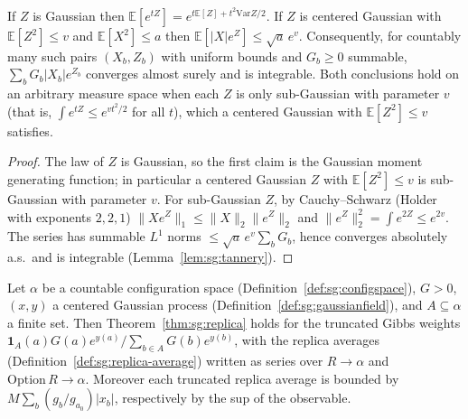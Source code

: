 \begin{lemma}\label{lem:sg:gaussexp}
  \leanok
If $Z$ is Gaussian then $\mathbb E[e^{tZ}]=e^{t\mathbb E[Z]+t^2\mathrm{Var}Z/2}$. If $Z$ is centered Gaussian with $\mathbb E[Z^2]\le v$ and
$\mathbb E[X^2]\le a$ then $\mathbb E[|X|e^{Z}]\le\sqrt a\,e^v$. Consequently, for countably many such pairs $(X_b,Z_b)$ with uniform bounds and
$G_b\ge0$ summable, $\sum_bG_b|X_b|e^{Z_b}$ converges almost surely and is integrable.
Both conclusions hold on an arbitrary measure space when each $Z$ is only sub-Gaussian with parameter $v$
(that is, $\int e^{tZ}\le e^{vt^2/2}$ for all $t$), which a centered Gaussian with $\mathbb E[Z^2]\le v$ satisfies.
\end{lemma}

\begin{proof}
  \leanok
The law of $Z$ is Gaussian, so the first claim is the Gaussian moment generating function; in particular a centered
Gaussian $Z$ with $\mathbb E[Z^2]\le v$ is sub-Gaussian with parameter $v$. For sub-Gaussian $Z$, by Cauchy--Schwarz (Holder with exponents
$2,2,1$) $\|Xe^Z\|_1\le\|X\|_2\|e^Z\|_2$ and $\|e^Z\|_2^2=\int e^{2Z}\le e^{2v}$. The series has summable $L^1$ norms
$\le\sqrt a\,e^v\sum_bG_b$, hence converges absolutely a.s.\ and is integrable (Lemma~\ref{lem:sg:tannery}).
\end{proof}

\begin{theorem}\label{thm:sg:truncation}
  \leanok
Let $\alpha$ be a countable configuration space (Definition~\ref{def:sg:configspace}), $G>0$, $(x,y)$ a centered Gaussian process (Definition~\ref{def:sg:gaussianfield}), and $A\subseteq\alpha$ a finite set. Then Theorem~\ref{thm:sg:replica}
holds for the truncated Gibbs weights $\mathbf 1_A(a)G(a)e^{y(a)}/\sum_{b\in A}G(b)e^{y(b)}$, with the replica averages (Definition~\ref{def:sg:replica-average}) written as series over
$R\to\alpha$ and $\mathrm{Option}\,R\to\alpha$. Moreover each truncated replica average is bounded by $M\sum_b(g_b/g_{a_0})|x_b|$, respectively
by the sup of the observable.
\end{theorem}

